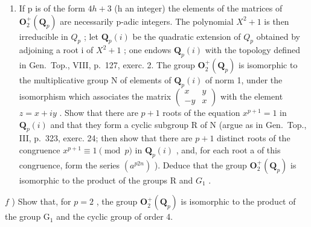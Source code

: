 \begin{enumerate}
\def\labelenumi{\alph{enumi})}
\setcounter{enumi}{4}
\tightlist
\item
  If p is of the form \(4h + 3\) (h an integer) the elements of the matrices of \(\mathbf{O}_{2}^{+}(\mathbf{Q}_{p})\) are necessarily p-adic integers. The polynomial \(X^{2} + 1\) is then irreducible in \(Q_{p}\) ; let \(\mathbf{Q}_{p}(i)\) be the quadratic extension of \(Q_{p}\) obtained by adjoining a root i of \(X^{2} + 1\) ; one endows \(\mathbf{Q}_{p}(i)\) with the topology defined in Gen.~Top., VIII, p.~127, exerc. 2. The group \(\mathbf{O}_{2}^{+}(\mathbf{Q}_{p})\) is isomorphic to the multiplicative group N of elements of \(\mathbf{Q}_{p}(i)\) of norm 1, under the isomorphism which associates the matrix \(\begin{pmatrix} x & y \\ -y & x \end{pmatrix}\) with the element \(z = x + iy\) . Show that there are \(p + 1\) roots of the equation \(x^{p+1} = 1\) in \(\mathbf{Q}_{p}(i)\) and that they form a cyclic subgroup R of N (argue as in Gen.~Top., III, p.~323, exerc. 24; then show that there are \(p + 1\) distinct roots of the congruence \(x^{p+1} \equiv 1 \pmod{p}\) in \(\mathbf{Q}_{p}(i)\) , and, for each root a of this congruence, form the series \((a^{p2n})\) ). Deduce that the group \(\mathbf{O}_{2}^{+}(\mathbf{Q}_{p})\) is isomorphic to the product of the groups R and \(G_{1}\) .
\end{enumerate}

\(f\) ) Show that, for \(p = 2\) , the group \(\mathbf{O}_2^+ (\mathbf{Q}_p)\) is isomorphic to the product of the group \(\mathrm{G}_1\) and the cyclic group of order 4.
\relax{}

